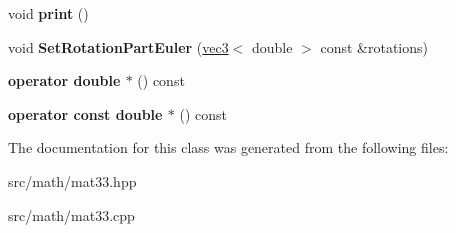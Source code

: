 \begin{DoxyCompactItemize}
\item 
\hypertarget{classmath_1_1mat33_aec1ee83e1f82fdba64beb97873aacb29}{
void {\bfseries print} ()}
\label{classmath_1_1mat33_aec1ee83e1f82fdba64beb97873aacb29}

\item 
\hypertarget{classmath_1_1mat33_a5d2f6b3899e6a58c77f64583d836ac4a}{
void {\bfseries SetRotationPartEuler} (\hyperlink{classmath_1_1vec3}{vec3}$<$ double $>$ const \&rotations)}
\label{classmath_1_1mat33_a5d2f6b3899e6a58c77f64583d836ac4a}

\item 
\hypertarget{classmath_1_1mat33_a24c9ed632b73464a6e17cdad4eeef613}{
{\bfseries operator double $\ast$} () const }
\label{classmath_1_1mat33_a24c9ed632b73464a6e17cdad4eeef613}

\item 
\hypertarget{classmath_1_1mat33_a97e2d6b636e4ba085f10d73a6d2af786}{
{\bfseries operator const double $\ast$} () const }
\label{classmath_1_1mat33_a97e2d6b636e4ba085f10d73a6d2af786}

\end{DoxyCompactItemize}


The documentation for this class was generated from the following files:\begin{DoxyCompactItemize}
\item 
src/math/mat33.hpp\item 
src/math/mat33.cpp\end{DoxyCompactItemize}
